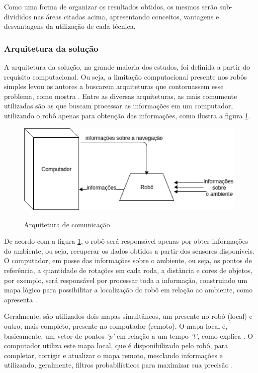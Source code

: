 		Como uma forma de organizar os resultados obtidos, os mesmos serão sub-divididos nas áreas citadas acima, apresentando conceitos, vantagens e desvantagens da utilização de cada técnica.

		\subsubsection{Arquitetura da solução}
		\label{sub:arquitetura_solucao}

			A arquitetura da solução, na grande maioria dos estudos, foi definida a partir do requisito computacional. Ou seja, a limitação computacional presente nos robôs simples levou os autores a buscarem arquiteturas que contornassem esse problema, como mostra \cite{redeComunicacaoIndustria}. Entre as diversas arquiteturas, as mais comumente utilizadas são as que buscam processar as informações em um computador, utilizando o robô apenas para obtenção das informações, como ilustra a figura \ref{img:arquitetura_mais_utilizada}.

			\begin{figure}[H]
				\centering
				\caption{Arquitetura de comunicação}
				\includegraphics[scale=0.9]{figuras/arquitetura_mais_utilizada.eps}
				\label{img:arquitetura_mais_utilizada}
			\end{figure}

			De acordo com a figura \ref{img:arquitetura_mais_utilizada}, o robô será responsável apenas por obter informações do ambiente, ou seja, recuperar os dados obtidos a partir dos sensores disponíveis. O computador, em posse das informações sobre o ambiente, ou seja, os pontos de referência, a quantidade de rotações em cada roda, a distância e cores de objetos, por exemplo, será responsável por processar toda a informação, construindo um mapa lógico para possibilitar a localização do robô em relação ao ambiente, como apresenta \cite{redeComunicacaoIndustria}.

			Geralmente, são utilizados dois mapas simultâneos, um presente no robô (local) e outro, mais completo, presente no computador (remoto). O mapa local é, basicamente, um vetor de pontos \textit{'p'} em relação a um tempo \textit{'t'}, como explica \cite{circumventingAssociationSLAM}. O computador utiliza este mapa local, que é disponibilizado pelo robô, para completar, corrigir e atualizar o mapa remoto, mesclando informações e utilizando, geralmente, filtros probabilísticos para maximizar sua precisão \cite{localizacaoEMapeamentoPaulo}.

